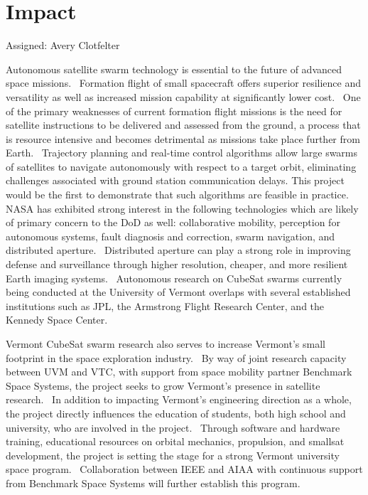 \section{Impact}
Assigned: Avery Clotfelter

Autonomous satellite swarm technology is essential to the future of
advanced space missions.  Formation flight of small spacecraft offers
superior resilience and versatility as well as increased mission
capability at significantly lower cost.  One of the primary weaknesses
of current formation flight missions is the need for satellite
instructions to be delivered and assessed from the ground, a process
that is resource intensive and becomes detrimental as missions take
place further from Earth.  Trajectory planning and real-time control 
algorithms allow large swarms of satellites to navigate autonomously 
with respect to a target orbit, eliminating challenges associated with
ground station communication delays.  This project would be the first to
demonstrate that such algorithms are feasible in practice.  NASA has exhibited 
strong interest in the following technologies which are likely of primary concern to the DoD
as well: collaborative mobility, perception for autonomous systems,
fault diagnosis and correction, swarm navigation, and distributed
aperture.  Distributed aperture can play a strong role in improving
defense and surveillance through higher resolution, cheaper, and more
resilient Earth imaging systems.  Autonomous research on CubeSat
swarms currently being conducted at the University of Vermont overlaps
with several established institutions such as JPL, the Armstrong
Flight Research Center, and the Kennedy Space Center. 

Vermont CubeSat swarm research also serves to increase Vermont’s small
footprint in the space exploration industry.  By way of joint research
capacity between UVM and VTC, with support from space mobility partner
Benchmark Space Systems, the project seeks to grow Vermont’s presence
in satellite research.  In addition to impacting Vermont’s engineering
direction as a whole, the project directly influences the education of
students, both high school and university, who are involved in the
project.  Through software and hardware training, educational
resources on orbital mechanics, propulsion, and smallsat development,
the project is setting the stage for a strong Vermont university space
program.  Collaboration between IEEE and AIAA with continuous support
from Benchmark Space Systems will further establish this program.

